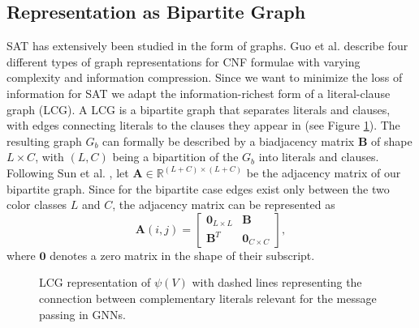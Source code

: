 \subsection{Representation as Bipartite Graph}
SAT has extensively been studied in the form of graphs. Guo et al. \cite{guo2023machine} describe four different types of graph representations for CNF formulae with varying complexity and information compression. Since we want to minimize the loss of information for SAT we adapt the information-richest form of a literal-clause graph (LCG). 
A LCG is a bipartite graph that separates literals and clauses, with edges connecting literals to the clauses they appear in (see Figure \ref{fig:lcg-sat}).
The resulting graph $G_b$ can formally be described by a biadjacency matrix $\mathbf{B}$ of shape $L \times C$, with $(L,C)$ being a bipartition of the $G_b$ into literals and clauses. \\
Following Sun et al. \cite{articleBiadjacency}, let $\mathbf{A} \in \mathbb{R}^{(L+C) \times (L+C)}$ be the adjacency matrix of our bipartite graph. Since for the bipartite case edges exist only between the two color classes $L$ and $C$, the adjacency matrix can be represented as
\begin{equation}
    \mathbf{A}(i,j) = \begin{bmatrix}
        \mathbf{0}_{L \times L} & \mathbf{B} \\
        \mathbf{B}^T & \mathbf{0}_{C \times C}
    \end{bmatrix},
\end{equation}
where $\mathbf{0}$ denotes a zero matrix in the shape of their subscript. \bigskip

\begin{figure}[h]
    \centering
    \caption[Bipartite graph in LCG]{LCG representation of $\psi(V)$ with dashed lines representing the connection between complementary literals relevant for the message passing in GNNs.}
    \label{fig:lcg-sat}
\end{figure}

